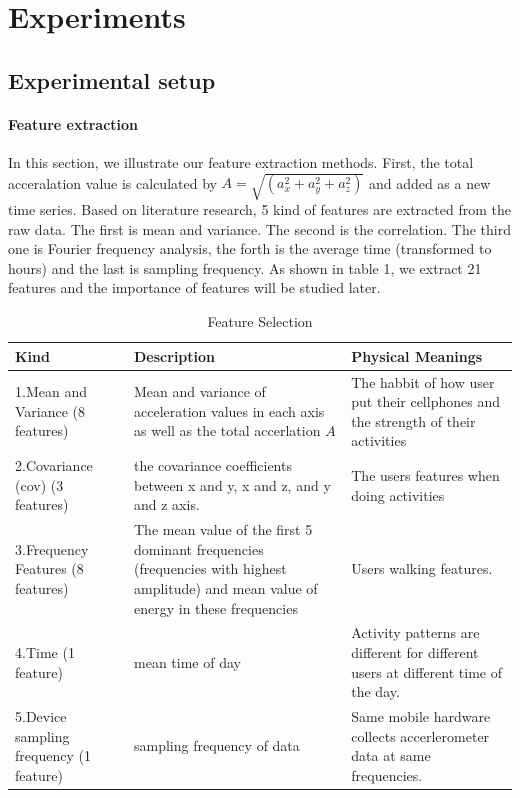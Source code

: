 \documentclass[11pt,letterpaper]{article}
\begin{document}
\section{Experiments}
\label{sec:experiments}

\subsection{Experimental setup}
\label{sec:experimental-setup}
\paragraph{Feature extraction}
In this section, we illustrate our feature extraction methods.
First, the total acceralation value is calculated by $A=\sqrt{(a_x^2+a_y^2+a_z^2)}$ and added as a new time series. Based on literature research, 5 kind of features are extracted from the raw data. The first is mean and variance. The second is the correlation. The third one is Fourier frequency analysis, the forth is the average time (transformed to hours) and the last is sampling frequency. As shown in table 1, we extract 21 features and the importance of features will be studied later.
		\begin{table}
			\centering
			\caption{Feature Selection}
			\begin{tabular}{p{3cm}|p{6cm}|p{4cm}}
			Kind & Description & Physical Meanings \\ \hline
			1.Mean and Variance (8 features) & Mean and variance of acceleration values in each axis as well as the total accerlation $A$ & The habbit of how user put their cellphones and the strength of their activities \\ \hline
			2.Covariance (cov) (3 features) & the covariance coefficients between x and y, x and z, and y and z axis. & The users features when doing activities \\ \hline
			3.Frequency Features (8 features) & The mean value of the first 5 dominant frequencies (frequencies with highest amplitude) and mean value of energy in these frequencies & Users walking features.\\ \hline
			4.Time (1 feature) & mean time of day & Activity patterns are different for different users at different time of the day.\\ \hline
			5.Device sampling frequency (1 feature) & sampling frequency of data & Same mobile hardware collects accerlerometer data at same frequencies.
			\end{tabular}
		\end{table}
\end{document}
